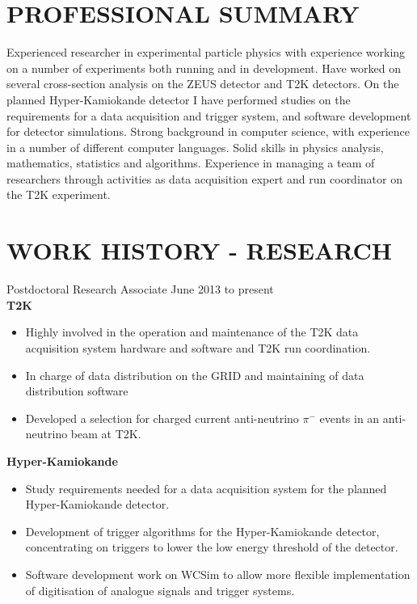\documentclass[margin]{res}
\begin{document}
 
\begin{resume} 

\section{PROFESSIONAL SUMMARY}

Experienced researcher in experimental particle physics with experience working on a number of experiments both running and in development.  Have worked on several cross-section analysis on the ZEUS detector and T2K detectors.  On the planned Hyper-Kamiokande detector I have performed studies on the requirements for a data acquisition and trigger system, and software development for detector simulations.  Strong background in computer science, with experience in a number of different computer languages.  Solid skills in physics analysis, mathematics, statistics and algorithms.  Experience in managing a team of researchers through activities as data acquisition expert and run coordinator on the T2K experiment.  

\section{WORK HISTORY - RESEARCH}

Postdoctoral Research Associate \hfill June 2013 to present\\

\textbf{T2K}

\begin{itemize}
\item Highly involved in the operation and maintenance of the T2K data acquisition system hardware and software and T2K run coordination.
\item In charge of data distribution on the GRID and maintaining of data distribution software
\item Developed a selection for charged current anti-neutrino $\pi^{-}$ events in an anti-neutrino beam at T2K.
\end{itemize}

\textbf{Hyper-Kamiokande}

\begin{itemize}
\item Study requirements needed for a data acquisition system for the planned Hyper-Kamiokande detector.
\item Development of trigger algorithms for the Hyper-Kamiokande detector, concentrating on triggers to lower the low energy threshold of the detector.
\item Software development work on WCSim to allow more flexible implementation of digitisation of analogue signals and trigger systems.
\end{itemize}


\end{resume}
\end{document}
